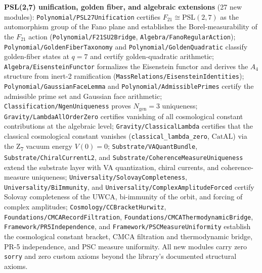 \documentclass[11pt,a4paper]{article}
\theoremstyle{definition}
\newcommand{\CatAL}{\ensuremath{\mathrm{CatAL}}}
\begin{document}
\medskip
\noindent\textbf{PSL(2,7) unification, golden fiber, and algebraic extensions}
(27 new modules):
\texttt{Polynomial/PSL27Unification} certifies $F_{21} \cong \mathrm{PSL}(2,7)$
as the automorphism group of the Fano plane and establishes the Borel-measurability
of the $F_{21}$ action (\texttt{Polynomial/F21SU2Bridge},
\texttt{Algebra/FanoRegularAction});
\texttt{Polynomial/GoldenFiberTaxonomy} and \texttt{Polynomial/GoldenQuadratic}
classify golden-fiber states at $q=7$ and certify golden-quadratic arithmetic;
\texttt{Algebra/EisensteinFunctor} formalizes the Eisenstein functor and
derives the $A_4$ structure from inert-2 ramification
(\texttt{MassRelations/EisensteinIdentities});
\texttt{Polynomial/GaussianFaceLemma} and \texttt{Polynomial/AdmissiblePrimes}
certify the admissible prime set and Gaussian face arithmetic;
\texttt{Classification/NgenUniqueness} proves $N_{\mathrm{gen}} = 3$ uniqueness;
\texttt{Gravity/LambdaAllOrderZero} certifies vanishing of all cosmological constant
contributions at the algebraic level;
\texttt{Gravity/ClassicalLambda} certifies that the classical cosmological constant
vanishes (\texttt{classical\_lambda\_zero}, \CatAL) via the Z\textsubscript{7} vacuum
energy $V(0)=0$;
\texttt{Substrate/VAQuantBundle}, \texttt{Substrate/ChiralCurrentL2}, and
\texttt{Substrate/CoherenceMeasureUniqueness} extend the substrate layer
with VA quantization, chiral currents, and coherence-measure uniqueness;
\texttt{Universality/SolovayCompleteness}, \texttt{Universality/BiImmunity}, and
\texttt{Universality/ComplexAmplitudeForced} certify Solovay completeness of
the UWCA, bi-immunity of the orbit, and forcing of complex amplitudes;
\texttt{Cosmology/CCBracketHurwitz}, \texttt{Foundations/CMCARecordFiltration},
\texttt{Foundations/CMCAThermodynamicBridge}, \texttt{Framework/PR5Independence},
and \texttt{Framework/PSCMeasureUniformity} establish the cosmological constant bracket,
CMCA filtration and thermodynamic bridge, PR-5 independence, and PSC measure uniformity.
All new modules carry zero \texttt{sorry} and zero custom axioms beyond the library's
documented structural axioms.
\end{document}
